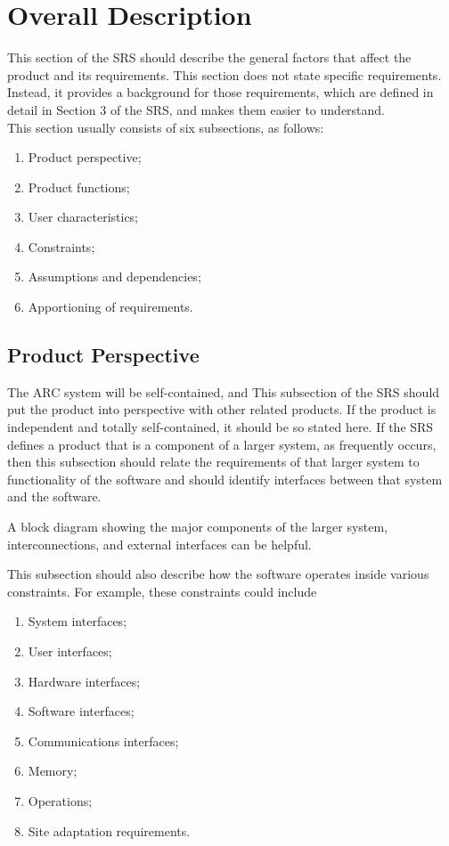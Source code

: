 \documentclass[draftclsnofoot,onecolumn,10pt]{IEEEtran}
\begin{document}
\section{Overall Description}
This section of the SRS should describe the general factors that affect the
product and its requirements. This section does not state specific requirements.
Instead, it provides a background for those requirements, which are defined in
detail in Section 3 of the SRS, and makes them easier to understand.\\
This section usually consists of six subsections, as follows:
\begin{enumerate}
	\item Product perspective;
	\item Product functions;
	\item User characteristics;
	\item Constraints;
	\item Assumptions and dependencies;
	\item Apportioning of requirements.
\end{enumerate}

\subsection{Product Perspective} %
The ARC system will be self-contained, and 
This subsection of the SRS should put the product into perspective with other
related products. If the product is independent and totally self-contained, it
should be so stated here. If the SRS defines a product that is a component of a
larger system, as frequently occurs, then this subsection should relate the
requirements of that larger system to functionality of the software and should
identify interfaces between that system and the software.

A block diagram showing the major components of the larger system,
interconnections, and external interfaces can be helpful.

This subsection should also describe how the software operates inside various
constraints. For example, these constraints could include
\begin{enumerate}
	\item System interfaces;
	\item User interfaces;
	\item Hardware interfaces;
	\item Software interfaces;
	\item Communications interfaces;
	\item Memory;
	\item Operations;
	\item Site adaptation requirements.
\end{enumerate}
\end{document}
